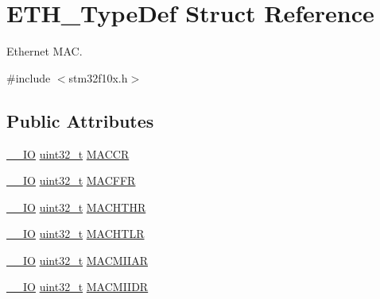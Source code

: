 \hypertarget{struct_e_t_h___type_def}{}\section{E\+T\+H\+\_\+\+Type\+Def Struct Reference}
\label{struct_e_t_h___type_def}


Ethernet M\+AC.  




{\ttfamily \#include $<$stm32f10x.\+h$>$}

\subsection*{Public Attributes}
\begin{DoxyCompactItemize}
\item 
\hyperlink{group___c_m_s_i_s___c_m3__core__definitions_gaec43007d9998a0a0e01faede4133d6be}{\+\_\+\+\_\+\+IO} \hyperlink{_p_e___types_8h_a33594304e786b158f3fb30289278f5af}{uint32\+\_\+t} \hyperlink{struct_e_t_h___type_def_a68d7e7c68b5b8adcf7b2b96bc1eea7d9}{M\+A\+C\+CR}
\item 
\hyperlink{group___c_m_s_i_s___c_m3__core__definitions_gaec43007d9998a0a0e01faede4133d6be}{\+\_\+\+\_\+\+IO} \hyperlink{_p_e___types_8h_a33594304e786b158f3fb30289278f5af}{uint32\+\_\+t} \hyperlink{struct_e_t_h___type_def_afdf573860dd5dcd13f2b6b19dcb92cc1}{M\+A\+C\+F\+FR}
\item 
\hyperlink{group___c_m_s_i_s___c_m3__core__definitions_gaec43007d9998a0a0e01faede4133d6be}{\+\_\+\+\_\+\+IO} \hyperlink{_p_e___types_8h_a33594304e786b158f3fb30289278f5af}{uint32\+\_\+t} \hyperlink{struct_e_t_h___type_def_ace541cc94118ec2db7c930a44960aa18}{M\+A\+C\+H\+T\+HR}
\item 
\hyperlink{group___c_m_s_i_s___c_m3__core__definitions_gaec43007d9998a0a0e01faede4133d6be}{\+\_\+\+\_\+\+IO} \hyperlink{_p_e___types_8h_a33594304e786b158f3fb30289278f5af}{uint32\+\_\+t} \hyperlink{struct_e_t_h___type_def_a22bd30c653a4c1c8f46a59e0a821dcf8}{M\+A\+C\+H\+T\+LR}
\item 
\hyperlink{group___c_m_s_i_s___c_m3__core__definitions_gaec43007d9998a0a0e01faede4133d6be}{\+\_\+\+\_\+\+IO} \hyperlink{_p_e___types_8h_a33594304e786b158f3fb30289278f5af}{uint32\+\_\+t} \hyperlink{struct_e_t_h___type_def_af697fcc940139f7dcb483766420852be}{M\+A\+C\+M\+I\+I\+AR}
\item 
\hyperlink{group___c_m_s_i_s___c_m3__core__definitions_gaec43007d9998a0a0e01faede4133d6be}{\+\_\+\+\_\+\+IO} \hyperlink{_p_e___types_8h_a33594304e786b158f3fb30289278f5af}{uint32\+\_\+t} \hyperlink{struct_e_t_h___type_def_a3d4c60bb689285b937c939b36a1233a3}{M\+A\+C\+M\+I\+I\+DR}

\end{DoxyCompactItemize}
